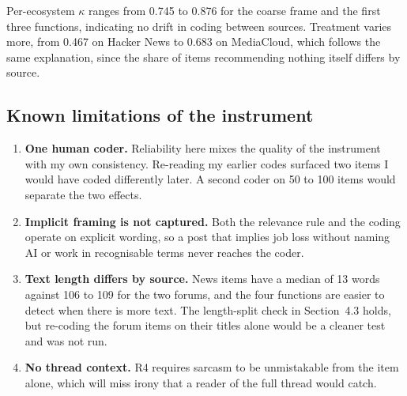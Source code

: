 Per-ecosystem $\kappa$ ranges from 0.745 to 0.876 for the coarse frame and the
first three functions, indicating no drift in coding between sources. Treatment
varies more, from 0.467 on Hacker News to 0.683 on MediaCloud, which follows the
same explanation, since the share of items recommending nothing itself differs
by source.

\subsection{Known limitations of the instrument}

\begin{enumerate}[nosep,leftmargin=1.6em]
  \item \textbf{One human coder.} Reliability here mixes the quality of the
        instrument with my own consistency. Re-reading my earlier codes surfaced
        two items I would have coded differently later. A second coder on 50 to
        100 items would separate the two effects.
  \item \textbf{Implicit framing is not captured.} Both the relevance rule and
        the coding operate on explicit wording, so a post that implies job loss
        without naming AI or work in recognisable terms never reaches the coder.
  \item \textbf{Text length differs by source.} News items have a median of 13
        words against 106 to 109 for the two forums, and the four functions are
        easier to detect when there is more text. The length-split check in
        Section~4.3 holds, but re-coding the forum items on their titles alone
        would be a cleaner test and was not run.
  \item \textbf{No thread context.} R4 requires sarcasm to be unmistakable from
        the item alone, which will miss irony that a reader of the full thread
        would catch.
\end{enumerate}
